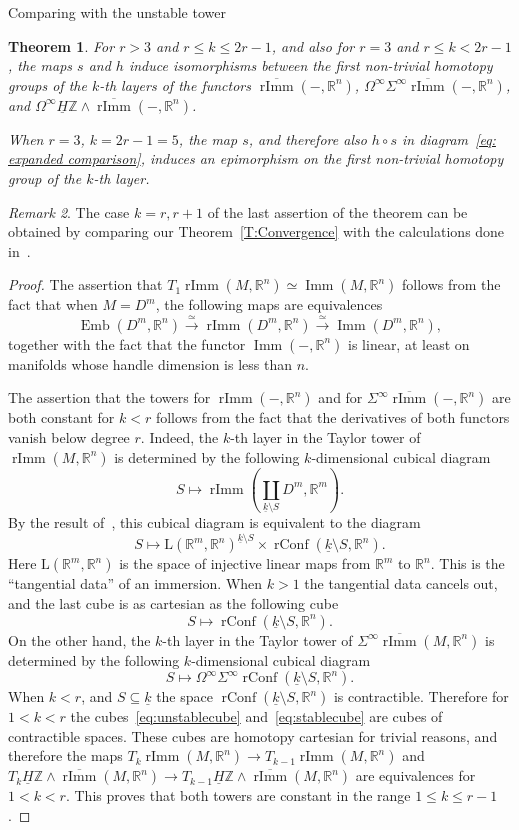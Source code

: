 \documentclass[12pt]{amsart}
\newcommand{\R}{{\mathbb R}}
\newcommand{\Z}{{\mathbb Z}}
\newcommand{\Emb}{\operatorname{Emb}}
\newcommand{\Imm}{\operatorname{Imm}}
\newcommand{\rImm}{\operatorname{rImm}}
\newcommand{\rbar}{\overline{\rImm}}
\newcommand{\rConf}{\operatorname{rConf}}
\newcommand{\HZ}{\underline{H}\Z}
\theoremstyle{plain}
\newtheorem{thm}{Theorem}[section]
\theoremstyle{definition}
\theoremstyle{remark}
\newtheorem{rem}[thm]{Remark}
\begin{document}
\begin{section}{Comparing with the unstable tower}
\begin{thm}
For $r>3$ and $r\le k\le 2r-1$, and also for $r=3$ and $r\le k < 2r-1$, the maps $s$ and $h$ induce isomorphisms between the first non-trivial homotopy groups of the $k$-th layers of the functors $\rbar(-, \R^n)$, $\Omega^\infty \Sigma^\infty \rbar(-, \R^n)$, and $\Omega^\infty\HZ\wedge \rbar(-, \R^n)$. 

When $r=3$, $k=2r-1=5$, the map $s$, and therefore also $h\circ s$ in diagram~\eqref{eq: expanded comparison}, induces an epimorphism on the first non-trivial homotopy group of the $k$-th layer. 
\end{thm}
\begin{rem}
The case $k=r, r+1$ of the last assertion of the theorem can be obtained by comparing our Theorem~\ref{T:Convergence} with the calculations done in~\cite{SSV:r-imm}.
\end{rem}
\begin{proof}
The assertion that $T_1\rImm(M, \R^n)\simeq \Imm(M, \R^n)$ follows from the fact that when $M=D^m$, the following maps are  equivalences~\cite{AS:rimmrconf}
\[
\Emb(D^m, \R^n)\xrightarrow{\simeq} \rImm(D^m, \R^n) \xrightarrow{\simeq} \Imm(D^m, \R^n),
\]
together with the fact that the functor $\Imm(-, \R^n)$ is linear, at least on manifolds whose handle dimension is less than $n$.

The assertion that the towers for $\rImm(-, \R^n)$ and for $\Sigma^\infty \rbar(-, \R^n)$ are both constant for $k<r$ follows from the fact that the derivatives of both functors vanish below degree $r$. Indeed, the $k$-th layer in the Taylor tower of $\rImm(M, \R^n)$ is determined by the following $k$-dimensional cubical diagram
\[
S\mapsto \rImm(\coprod_{\underline{k}\setminus S} D^m, \R^m).
\] 
By the result of~\cite{AS:rimmrconf}, this cubical diagram is equivalent to the diagram
\[
S\mapsto \mathrm{L}(\R^m, \R^n)^{\underline{k}\setminus S}\times \rConf({\underline{k}\setminus S}, \R^n).
\] 
Here $\mathrm{L}(\R^m, \R^n)$ is the space of injective linear maps from $\R^m$ to $\R^n$. This is the ``tangential data'' of an immersion. When $k>1$ the tangential data cancels out, and the last cube is as cartesian as the following cube
\begin{equation}\label{eq:unstablecube}
S\mapsto \rConf({\underline{k}\setminus S}, \R^n).
\end{equation}
On the other hand, the $k$-th layer in the Taylor tower of $ \Sigma^\infty \rbar(M, \R^n)$ is determined by the following $k$-dimensional cubical diagram
\begin{equation}\label{eq:stablecube}
S\mapsto \Omega^\infty\Sigma^\infty \rConf({\underline{k}\setminus S}, \R^n).
\end{equation}
When $k<r$, and $S\subseteq \underline{k}$ the space $\rConf({\underline{k}\setminus S}, \R^n)$ is contractible. Therefore for $1<k<r$ the cubes~\eqref{eq:unstablecube} and~\eqref{eq:stablecube} are cubes of contractible spaces. These cubes are homotopy cartesian for trivial reasons, and therefore the maps $T_k\rImm(M, \R^n)\to T_{k-1}\rImm(M, \R^n)$ and  $T_k \HZ\wedge \rbar(M, \R^n)\to T_{k-1} \HZ\wedge \rbar(M, \R^n)$ are equivalences for $1<k<r$. This proves that both towers are constant in the range $1\le k \le r-1$.


\end{proof}
\end{section}
\end{document}
